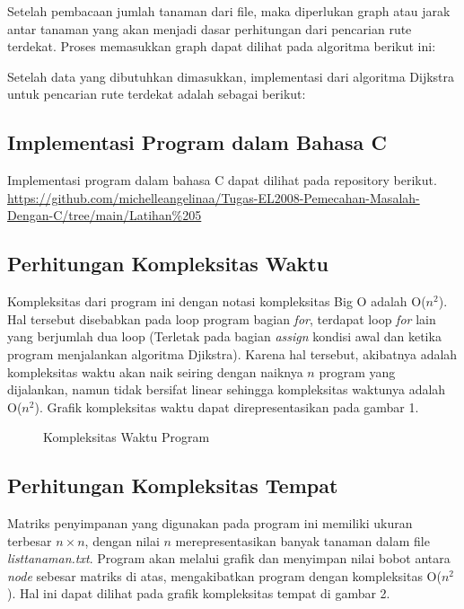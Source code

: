 \documentclass[conference]{IEEEtran}
\begin{document}
	Setelah pembacaan jumlah tanaman dari file, maka diperlukan graph atau jarak antar tanaman yang akan menjadi dasar perhitungan dari pencarian rute terdekat. Proses memasukkan graph dapat dilihat pada algoritma berikut ini:

	Setelah data yang dibutuhkan dimasukkan, implementasi dari algoritma Dijkstra untuk pencarian rute terdekat adalah sebagai berikut:

	\subsection{Implementasi Program dalam Bahasa C}
	Implementasi program dalam bahasa C dapat dilihat pada repository berikut. \url{https://github.com/michelleangelinaa/Tugas-EL2008-Pemecahan-Masalah-Dengan-C/tree/main/Latihan%205}

	\subsection{Perhitungan Kompleksitas Waktu}
	Kompleksitas dari program ini dengan notasi kompleksitas Big O adalah O(\begin{math} n^2 \end{math}). Hal tersebut disebabkan pada loop program bagian \textit{for}, terdapat loop \textit{for} lain yang berjumlah dua loop (Terletak pada bagian \textit{assign} kondisi awal dan ketika program menjalankan algoritma Djikstra). Karena hal tersebut, akibatnya adalah kompleksitas waktu akan naik seiring dengan naiknya \begin{math} n \end{math} program yang dijalankan, namun tidak bersifat linear sehingga kompleksitas waktunya adalah O(\begin{math} n^2 \end{math}). Grafik kompleksitas waktu dapat direpresentasikan pada gambar 1.

	\begin{figure}[htbp]
	\centering
	\scalebox{0.4}{}
	\caption{Kompleksitas Waktu Program}
	\end{figure}

	\subsection{ Perhitungan Kompleksitas Tempat}
	Matriks penyimpanan yang digunakan pada program ini memiliki ukuran terbesar \begin{math} n \times n \end{math}, dengan nilai \begin{math} n \end{math} merepresentasikan banyak tanaman dalam file \textit{listtanaman.txt}. Program akan melalui grafik dan menyimpan nilai bobot antara \textit{node} sebesar matriks di atas, mengakibatkan program dengan kompleksitas O(\begin{math} n^2 \end{math}). Hal ini dapat dilihat pada grafik kompleksitas tempat di gambar 2.
\end{document}
